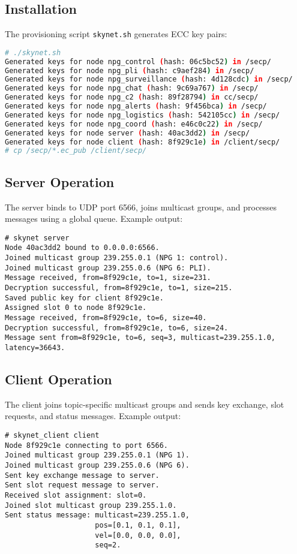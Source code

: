 \documentclass{article}
\begin{document}
\subsection{Installation}
The provisioning script \texttt{skynet.sh} generates ECC key pairs:
\begin{lstlisting}[language=bash]
# ./skynet.sh
Generated keys for node npg_control (hash: 06c5bc52) in /secp/
Generated keys for node npg_pli (hash: c9aef284) in /secp/
Generated keys for node npg_surveillance (hash: 4d128cdc) in /secp/
Generated keys for node npg_chat (hash: 9c69a767) in /secp/
Generated keys for node npg_c2 (hash: 89f28794) in cc/secp/
Generated keys for node npg_alerts (hash: 9f456bca) in /secp/
Generated keys for node npg_logistics (hash: 542105cc) in /secp/
Generated keys for node npg_coord (hash: e46c0c22) in /secp/
Generated keys for node server (hash: 40ac3dd2) in /secp/
Generated keys for node client (hash: 8f929c1e) in /client/secp/
# cp /secp/*.ec_pub /client/secp/
\end{lstlisting}

\subsection{Server Operation}
The server binds to UDP port 6566, joins multicast groups, and processes messages using a global queue. Example output:
\begin{lstlisting}
# skynet server
Node 40ac3dd2 bound to 0.0.0.0:6566.
Joined multicast group 239.255.0.1 (NPG 1: control).
Joined multicast group 239.255.0.6 (NPG 6: PLI).
Message received, from=8f929c1e, to=1, size=231.
Decryption successful, from=8f929c1e, to=1, size=215.
Saved public key for client 8f929c1e.
Assigned slot 0 to node 8f929c1e.
Message received, from=8f929c1e, to=6, size=40.
Decryption successful, from=8f929c1e, to=6, size=24.
Message sent from=8f929c1e, to=6, seq=3, multicast=239.255.1.0, latency=36643.
\end{lstlisting}

\subsection{Client Operation}
The client joins topic-specific multicast groups and sends key exchange, slot requests, and status messages. Example output:
\begin{lstlisting}
# skynet_client client
Node 8f929c1e connecting to port 6566.
Joined multicast group 239.255.0.1 (NPG 1).
Joined multicast group 239.255.0.6 (NPG 6).
Sent key exchange message to server.
Sent slot request message to server.
Received slot assignment: slot=0.
Joined slot multicast group 239.255.1.0.
Sent status message: multicast=239.255.1.0,
                     pos=[0.1, 0.1, 0.1],
                     vel=[0.0, 0.0, 0.0],
                     seq=2.
\end{lstlisting}
\end{document}
